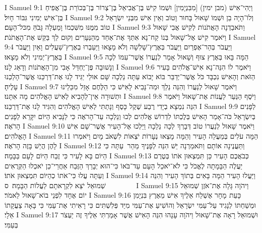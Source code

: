 I Samuel 9:1	וַיְהִי־אִישׁ (מבן ימין) [מִבִּנְיָמִין] וּשְׁמוֹ קִישׁ בֶּן־אֲבִיאֵל בֶּן־צְרוֹר בֶּן־בְּכוֹרַת בֶּן־אֲפִיחַ בֶּן־אִישׁ יְמִינִי גִּבּוֹר חָיִל׃
I Samuel 9:2	וְלוֹ־הָיָה בֵן וּשְׁמוֹ שָׁאוּל בָּחוּר וָטוֹב וְאֵין אִישׁ מִבְּנֵי יִשְׂרָאֵל טוֹב מִמֶּנּוּ מִשִּׁכְמוֹ וָמַעְלָה גָּבֹהַּ מִכּל־הָעָם׃
I Samuel 9:3	וַתֹּאבַדְנָה הָאֲתֹנוֹת לְקִישׁ אֲבִי שָׁאוּל וַיֹּאמֶר קִישׁ אֶל־שָׁאוּל בְּנוֹ קַח־נָא אִתְּךָ אֶת־אַחַד מֵהַנְּעָרִים וְקוּם לֵךְ בַּקֵּשׁ אֶת־הָאֲתֹנֹת׃
I Samuel 9:4	וַיַּעֲבֹר בְּהַר־אֶפְרַיִם וַיַּעֲבֹר בְּאֶרֶץ־שָׁלִשָׁה וְלֹא מָצָאוּ וַיַּעַבְרוּ בְאֶרֶץ־שַׁעֲלִים וָאַיִן וַיַּעֲבֹר בְּאֶרֶץ־יְמִינִי וְלֹא מָצָאוּ׃
I Samuel 9:5	הֵמָּה בָּאוּ בְּאֶרֶץ צוּף וְשָׁאוּל אָמַר לְנַעֲרוֹ אֲשֶׁר־עִמּוֹ לְכָה וְנָשׁוּבָה פֶּן־יֶחְדַּל אָבִי מִן־הָאֲתֹנוֹת וְדָאַג לָנוּ׃
I Samuel 9:6	וַיֹּאמֶר לוֹ הִנֵּה־נָא אִישׁ־אֱלֹהִים בָּעִיר הַזֹּאת וְהָאִישׁ נִכְבָּד כֹּל אֲשֶׁר־יְדַבֵּר בּוֹא יָבוֹא עַתָּה נֵלְכָה שָּׁם אוּלַי יַגִּיד לָנוּ אֶת־דַּרְכֵּנוּ אֲשֶׁר־הָלַכְנוּ עָלֶיהָ׃
I Samuel 9:7	וַיֹּאמֶר שָׁאוּל לְנַעֲרוֹ וְהִנֵּה נֵלֵךְ וּמַה־נָּבִיא לָאִישׁ כִּי הַלֶּחֶם אָזַל מִכֵּלֵינוּ וּתְשׁוּרָה אֵין־לְהָבִיא לְאִישׁ הָאֱלֹהִים מָה אִתָּנוּ׃
I Samuel 9:8	וַיֹּסֶף הַנַּעַר לַעֲנוֹת אֶת־שָׁאוּל וַיֹּאמֶר הִנֵּה נִמְצָא בְיָדִי רֶבַע שֶׁקֶל כָּסֶף וְנָתַתִּי לְאִישׁ הָאֱלֹהִים וְהִגִּיד לָנוּ אֶת־דַּרְכֵּנוּ׃
I Samuel 9:9	לְפָנִים  בְּיִשְׂרָאֵל כֹּה־אָמַר הָאִישׁ בְּלֶכְתּוֹ לִדְרוֹשׁ אֱלֹהִים לְכוּ וְנֵלְכָה עַד־הָרֹאֶה כִּי לַנָּבִיא הַיּוֹם יִקָּרֵא לְפָנִים הָרֹאֶה׃
I Samuel 9:10	וַיֹּאמֶר שָׁאוּל לְנַעֲרוֹ טוֹב דְּבָרְךָ לְכָה  נֵלֵכָה וַיֵּלְכוּ אֶל־הָעִיר אֲשֶׁר־שָׁם אִישׁ הָאֱלֹהִים׃
I Samuel 9:11	הֵמָּה עֹלִים בְּמַעֲלֵה הָעִיר וְהֵמָּה מָצְאוּ נְעָרוֹת יֹצְאוֹת לִשְׁאֹב מָיִם וַיֹּאמְרוּ לָהֶן הֲיֵשׁ בָּזֶה הָרֹאֶה׃
I Samuel 9:12	וַתַּעֲנֶינָה אוֹתָם וַתֹּאמַרְנָה יֵּשׁ הִנֵּה לְפָנֶיךָ מַהֵר  עַתָּה כִּי הַיּוֹם בָּא לָעִיר כִּי זֶבַח הַיּוֹם לָעָם בַּבָּמָה׃
I Samuel 9:13	כְּבֹאֲכֶם הָעִיר כֵּן תִּמְצְאוּן אֹתוֹ בְּטֶרֶם יַעֲלֶה הַבָּמָתָה לֶאֱכֹל כִּי לֹא־יֹאכַל הָעָם עַד־בֹּאוֹ כִּי־הוּא יְבָרֵךְ הַזֶּבַח אַחֲרֵי־כֵן יֹאכְלוּ הַקְּרֻאִים וְעַתָּה עֲלוּ כִּי־אֹתוֹ כְהַיּוֹם תִּמְצְאוּן אֹתוֹ׃
I Samuel 9:14	וַיַּעֲלוּ הָעִיר הֵמָּה בָּאִים בְּתוֹךְ הָעִיר וְהִנֵּה שְׁמוּאֵל יֹצֵא לִקְרָאתָם לַעֲלוֹת הַבָּמָה׃ {ס}        
I Samuel 9:15	וַיהֹוָה גָּלָה אֶת־אֹזֶן שְׁמוּאֵל יוֹם אֶחָד לִפְנֵי בוֹא־שָׁאוּל לֵאמֹר׃
I Samuel 9:16	כָּעֵת  מָחָר אֶשְׁלַח אֵלֶיךָ אִישׁ מֵאֶרֶץ בִּנְיָמִן וּמְשַׁחְתּוֹ לְנָגִיד עַל־עַמִּי יִשְׂרָאֵל וְהוֹשִׁיעַ אֶת־עַמִּי מִיַּד פְּלִשְׁתִּים כִּי רָאִיתִי אֶת־עַמִּי כִּי בָּאָה צַעֲקָתוֹ אֵלָי׃
I Samuel 9:17	וּשְׁמוּאֵל רָאָה אֶת־שָׁאוּל וַיהֹוָה עָנָהוּ הִנֵּה הָאִישׁ אֲשֶׁר אָמַרְתִּי אֵלֶיךָ זֶה יַעְצֹר בְּעַמִּי׃
